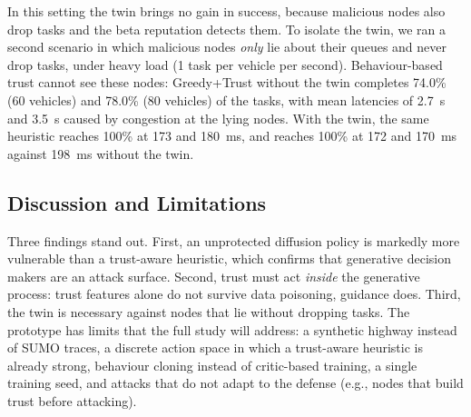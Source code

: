 In this setting the twin brings no gain in success, because malicious nodes also drop tasks and the beta reputation detects them. To isolate the twin, we ran a second scenario in which malicious nodes \emph{only} lie about their queues and never drop tasks, under heavy load (1 task per vehicle per second). Behaviour-based trust cannot see these nodes: Greedy+Trust without the twin completes 74.0\% (60 vehicles) and 78.0\% (80 vehicles) of the tasks, with mean latencies of 2.7~s and 3.5~s caused by congestion at the lying nodes. With the twin, the same heuristic reaches 100\% at 173 and 180~ms, and \tgd{} reaches 100\% at 172 and 170~ms against 198~ms without the twin.

\subsection{Discussion and Limitations}
Three findings stand out. First, an unprotected diffusion policy is markedly more vulnerable than a trust-aware heuristic, which confirms that generative decision makers are an attack surface. Second, trust must act \emph{inside} the generative process: trust features alone do not survive data poisoning, guidance does. Third, the twin is necessary against nodes that lie without dropping tasks. The prototype has limits that the full study will address: a synthetic highway instead of SUMO traces, a discrete action space in which a trust-aware heuristic is already strong, behaviour cloning instead of critic-based training, a single training seed, and attacks that do not adapt to the defense (e.g., nodes that build trust before attacking). 
